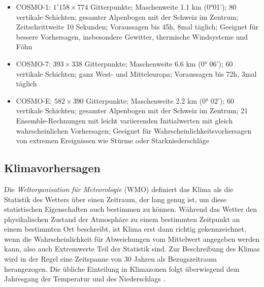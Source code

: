 \begin{refsection}
\begin{itemize}
\item COSMO-1: $1'158 \times 774$ Gitterpunkte; Maschenweite 1.1 km (0°01'); 80 vertikale Schichten; gesamter Alpenbogen mit der Schweiz im Zentrum; Zeitschrittweite 10 Sekunden; Voraussagen bis 45h, 8mal täglich; Geeignet für bessere Vorhersagen, insbesondere Gewitter, thermische Windsysteme und Föhn \cite{klima:meteoschweiz}
\item COSMO-7: $393 \times 338$ Gitterpunkte; Maschenweite 6.6 km (0° 06'); 60 vertikale Schichten; ganz West- und Mitteleuropa; Voraussagen bis 72h, 3mal täglich \cite{klima:meteoschweiz} 
\item COSMO-E: $582 \times 390$ Gitterpunkte; Maschenweite 2.2 km (0° 02'); 60 vertikale Schichten; gesamter Alpenbogen mit der Schweiz im Zentrum; 21 Ensemble-Rechnungen mit leicht variierenden Initialwerten mit gleich wahrscheinlichen Vorhersagen; Geeignet für Wahrscheinlichkeitsvorhersagen von extremen Ereignissen wie Stürme oder Starkniederschläge \cite{klima:meteoschweiz} 
\end{itemize}


\subsection{Klimavorhersagen
\label{klima:subsection:entstehung}}
Die {\em Weltorganisation für Meteorologie} (WMO) definiert das Klima als die Statistik des Wetters über einen Zeitraum, der lang genug ist, um diese statistischen Eigenschaften auch bestimmen zu können. Während das Wetter den physikalischen Zustand der Atmosphäre zu einem bestimmten Zeitpunkt an einem bestimmten Ort beschreibt, ist Klima erst dann richtig gekennzeichnet, wenn die Wahrscheinlichkeit für Abweichungen vom Mittelwert angegeben werden kann, also auch Extremwerte Teil der Statistik sind. Zur Beschreibung des Klimas wird in der Regel eine Zeitspanne von 30 Jahren als Bezugszeitraum herangezogen. Die übliche Einteilung in Klimazonen folgt überwiegend dem Jahresgang der Temperatur und des Niederschlags \cite{klima:maxplanck}.


\end{refsection}
